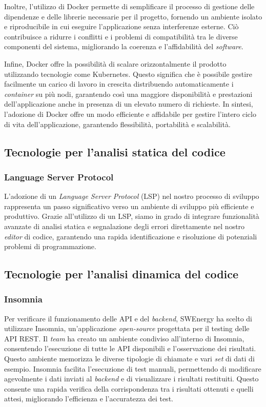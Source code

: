 Inoltre, l'utilizzo di Docker permette di semplificare il processo di gestione
delle dipendenze e delle librerie necessarie per il progetto, fornendo un
ambiente isolato e riproducibile in cui eseguire l'applicazione senza
interferenze esterne. Ciò contribuisce a ridurre i conflitti e i problemi di
compatibilità tra le diverse componenti del sistema, migliorando la coerenza e
l'affidabilità del \textit{software}.

Infine, Docker offre la possibilità di scalare orizzontalmente il prodotto
utilizzando tecnologie come Kubernetes. Questo significa che è possibile gestire
facilmente un carico di lavoro in crescita distribuendo automaticamente i
\textit{container} su più nodi, garantendo così una maggiore disponibilità e prestazioni
dell'applicazione anche in presenza di un elevato numero di richieste. In
sintesi, l'adozione di Docker offre un modo efficiente e affidabile per gestire l'intero ciclo di vita dell'applicazione, garantendo flessibilità, portabilità e scalabilità.

\subsection{Tecnologie per l'analisi statica del codice}

\subsubsection{Language Server Protocol}

L'adozione di un \textit{Language Server Protocol} (LSP) nel nostro processo di sviluppo
rappresenta un passo significativo verso un ambiente di sviluppo più efficiente
e produttivo. Grazie all'utilizzo di un LSP, siamo in grado di integrare
funzionalità avanzate di analisi statica e segnalazione degli errori
direttamente nel nostro \textit{editor} di codice, garantendo una rapida
identificazione e risoluzione di potenziali problemi di programmazione.

\subsection{Tecnologie per l'analisi dinamica del codice}

\subsubsection{Insomnia}
Per verificare il funzionamento delle API e del \textit{backend}, SWEnergy ha scelto di utilizzare Insomnia, un'applicazione \textit{open-source} progettata per il testing delle API REST. 
Il \textit{team} ha creato un ambiente condiviso all'interno di Insomnia, consentendo l'esecuzione di tutte le API disponibili e l'osservazione dei risultati. 
Questo ambiente memorizza le diverse tipologie di chiamate e vari \textit{set} di dati di esempio.
Insomnia facilita l'esecuzione di test manuali, permettendo di modificare agevolmente i dati inviati al \textit{backend} e di visualizzare i risultati restituiti. 
Questo consente una rapida verifica della corrispondenza tra i risultati ottenuti e quelli attesi, migliorando l'efficienza e l'accuratezza dei test.


